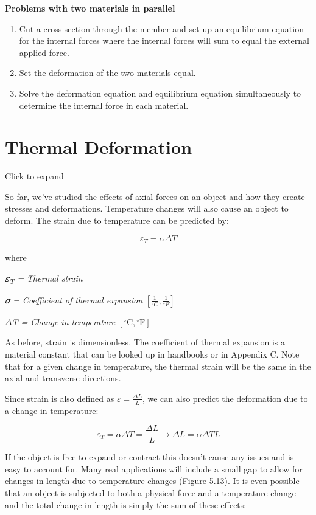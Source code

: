 \documentclass[
  letterpaper,
  DIV=11,
  numbers=noendperiod]{scrreprt}
\providecommand{\tightlist}{%
  \setlength{\itemsep}{0pt}\setlength{\parskip}{0pt}}\usepackage{longtable,booktabs,array}
\begin{document}
\begin{tcolorbox}
\textbf{Problems with two materials in parallel}

\begin{enumerate}
\def\labelenumi{\arabic{enumi}.}
\tightlist
\item
  Cut a cross-section through the member and set up an equilibrium
  equation for the internal forces where the internal forces will sum to
  equal the external applied force.
\item
  Set the deformation of the two materials equal.
\item
  Solve the deformation equation and equilibrium equation simultaneously
  to determine the internal force in each material.
\end{enumerate}

\end{tcolorbox}

\section{Thermal Deformation}\label{thermal-deformation}

Click to expand

So far, we've studied the effects of axial forces on an object and how
they create stresses and deformations. Temperature changes will also
cause an object to deform. The strain due to temperature can be
predicted by:

\[
\varepsilon_T=\alpha \Delta T\]

where

\emph{𝜀\textsubscript{T} = Thermal strain}

\emph{𝛼 = Coefficient of thermal expansion}
\(\left[\frac{1}{{ }^{\circ} C}, \frac{1}{{ }^{\circ} F}\right]\)

\emph{ΔT = Change in temperature}
\(\left[{ }^{\circ} \mathrm{C},{ }^{\circ} \mathrm{F}\right]\)

As before, strain is dimensionless. The coefficient of thermal expansion
is a material constant that can be looked up in handbooks or in Appendix
C. Note that for a given change in temperature, the thermal strain will
be the same in the axial and transverse directions.

Since strain is also defined as \(\varepsilon=\frac{\Delta L}{L}\), we
can also predict the deformation due to a change in temperature:

\[
\varepsilon_T=\alpha \Delta T=\frac{\Delta L}{L} \rightarrow \Delta L=\alpha \Delta T L\]

If the object is free to expand or contract this doesn't cause any
issues and is easy to account for. Many real applications will include a
small gap to allow for changes in length due to temperature changes
(Figure 5.13). It is even possible that an object is subjected to both a
physical force and a temperature change and the total change in length
is simply the sum of these effects:
\end{document}
